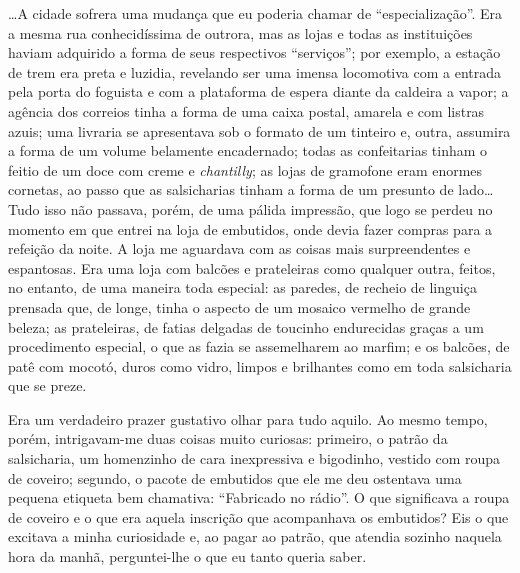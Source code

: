 
\ldots{}A cidade sofrera uma mudança que eu poderia chamar de
``especialização''. Era a mesma rua conhecidíssima de outrora, mas as
lojas e todas as instituições haviam adquirido a forma de seus
respectivos ``serviços''; por exemplo, a estação de trem era preta e
luzidia, revelando ser uma imensa locomotiva com a entrada pela porta do
foguista e com a plataforma de espera diante da caldeira a vapor; a
agência dos correios tinha a forma de uma caixa postal, amarela e com
listras azuis; uma livraria se apresentava sob o formato de um tinteiro
e, outra, assumira a forma de um volume belamente encadernado; todas as
confeitarias tinham o feitio de um doce com creme e \textit{chantilly}; as lojas
de gramofone eram enormes cornetas, ao passo que as salsicharias tinham
a forma de um presunto de lado\ldots{} Tudo isso não passava, porém, de
uma pálida impressão, que logo se perdeu no momento em que entrei na
loja de embutidos, onde devia fazer compras para a refeição da noite. A
loja me aguardava com as coisas mais surpreendentes e espantosas. Era
uma loja com balcões e prateleiras como qualquer outra, feitos, no
entanto, de uma maneira toda especial: as paredes, de recheio de
linguiça prensada que, de longe, tinha o aspecto de um mosaico vermelho
de grande beleza; as prateleiras, de fatias delgadas de toucinho
endurecidas graças a um procedimento especial, o que as fazia se
assemelharem ao marfim; e os balcões, de patê com mocotó, duros como
vidro, limpos e brilhantes como em toda salsicharia que se preze.

Era um verdadeiro prazer gustativo olhar para tudo aquilo. Ao mesmo
tempo, porém, intrigavam-me duas coisas muito curiosas: primeiro, o
patrão da salsicharia, um homenzinho de cara inexpressiva e bigodinho,
vestido com roupa de coveiro; segundo, o pacote de embutidos que ele me
deu ostentava uma pequena etiqueta bem chamativa: ``Fabricado no
rádio''. O que significava a roupa de coveiro e o que era aquela
inscrição que acompanhava os embutidos? Eis o que excitava a minha
curiosidade e, ao pagar ao patrão, que atendia sozinho naquela hora da
manhã, perguntei-lhe o que eu tanto queria saber.

